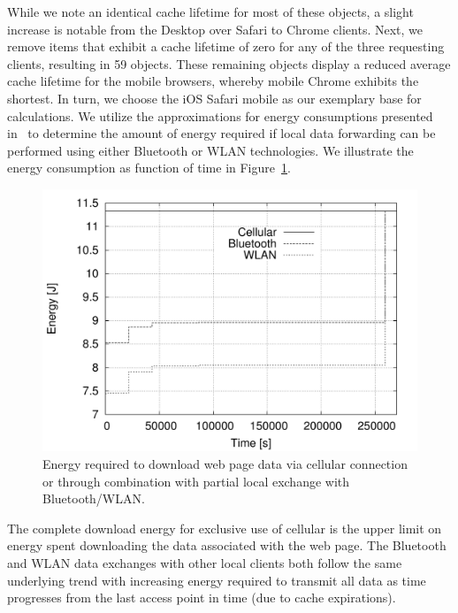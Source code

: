 \documentclass[letterpaper,conference]{IEEEtran}
\begin{document}
While we note an identical cache lifetime for most of these objects, a slight increase is notable from the Desktop over Safari to Chrome clients.  
Next, we remove items that exhibit a cache lifetime of zero for any of the three requesting clients, resulting in 59 objects.
These remaining objects display a reduced average cache lifetime for the mobile browsers, whereby mobile Chrome exhibits the shortest.
In turn, we choose the iOS Safari mobile as our exemplary base for calculations. 
We utilize the approximations for energy consumptions presented in~\cite{PeFiWi11} to determine the amount of energy required if local data forwarding can be performed using either Bluetooth or WLAN technologies. 
We illustrate the energy consumption as function of time in Figure~\ref{fig:ios_time_energy}.
\begin{figure}
	\centering
	\includegraphics[width=.925\linewidth]{energy_ios_time}
	\caption{Energy required to download web page data via cellular connection or through combination with partial local exchange with Bluetooth/WLAN.}
	\label{fig:ios_time_energy}
\end{figure}
The complete download energy for exclusive use of cellular is the upper limit on energy spent downloading the data associated with the web page. 
The Bluetooth and WLAN data exchanges with other local clients both follow the same underlying trend with increasing energy required to transmit all data as time progresses from the last access point in time (due to cache expirations).
\end{document}
